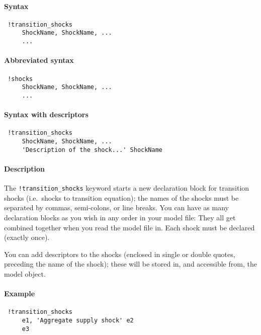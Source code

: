 


	\paragraph{Syntax}
 
 \begin{verbatim}
 !transition_shocks
     ShockName, ShockName, ...
     ...
 \end{verbatim}
 
 \paragraph{Abbreviated syntax}
 
 \begin{verbatim}
 !shocks
     ShockName, ShockName, ...
     ...
 \end{verbatim}
 
 \paragraph{Syntax with descriptors}
 
 \begin{verbatim}
 !transition_shocks
     ShockName, ShockName, ...
     'Description of the shock...' ShockName
 \end{verbatim}
 
 \paragraph{Description}
 
 The \texttt{!transition\_shocks} keyword starts a new declaration block
 for transition shocks (i.e.~shocks to transition equation); the names of
 the shocks must be separated by commas, semi-colons, or line breaks. You
 can have as many declaration blocks as you wish in any order in your
 model file: They all get combined together when you read the model file
 in. Each shock must be declared (exactly once).
 
 You can add descriptors to the shocks (enclosed in single or double
 quotes, preceding the name of the shock); these will be stored in, and
 accessible from, the model object.
 
 \paragraph{Example}
 
 \begin{verbatim}
 !transition_shocks
     e1, 'Aggregate supply shock' e2
     e3
 \end{verbatim}


